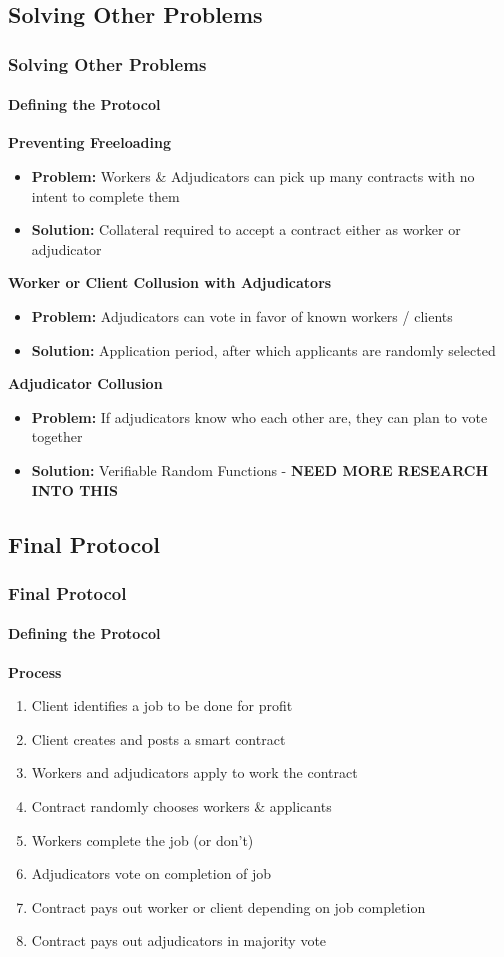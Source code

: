\documentclass[
	10pt, %
	aspectratio=169, %
]{beamer}
\begin{document}
\subsection{Solving Other Problems}
\begin{frame}
	\frametitle{Solving Other Problems}
	\framesubtitle{Defining the Protocol}

	{
		\large \bf
		Preventing Freeloading
	}
	\begin{itemize}
		\item \textbf{Problem:} Workers \& Adjudicators can pick up many contracts with no intent to complete them
		\item \textbf{Solution:} Collateral required to accept a contract either as worker or adjudicator
	\end{itemize}

	\medskip

	{
		\large \bf
		Worker or Client Collusion with Adjudicators
	}
	\begin{itemize}
		\item \textbf{Problem:} Adjudicators can vote in favor of known workers / clients
		\item \textbf{Solution:} Application period, after which applicants are randomly selected
	\end{itemize}

	\medskip

	{
		\large \bf
		Adjudicator Collusion
	}
	\begin{itemize}
		\item \textbf{Problem:} If adjudicators know who each other are, they can plan to vote together
		\item \textbf{Solution:} Verifiable Random Functions - \textbf{NEED MORE RESEARCH INTO THIS}
	\end{itemize}
\end{frame}

\subsection{Final Protocol}
\begin{frame}
	\frametitle{Final Protocol}
	\framesubtitle{Defining the Protocol}
	{
		\large \bf Process
	}
	\begin{enumerate}
		\item Client identifies a job to be done for profit
		\item Client creates and posts a smart contract
		\item Workers and adjudicators apply to work the contract
		\item Contract randomly chooses workers \& applicants
		\item Workers complete the job (or don't)
		\item Adjudicators vote on completion of job
		\item Contract pays out worker or client depending on job completion
		\item Contract pays out adjudicators in majority vote
	\end{enumerate}
\end{frame}
\end{document}
